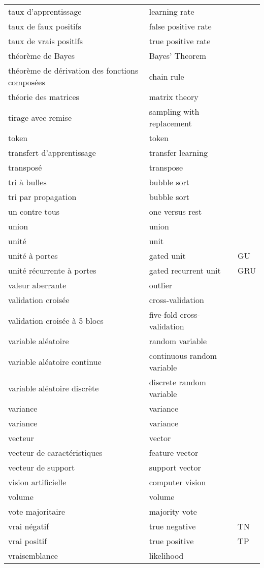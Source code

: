 \begin{longtable}{p{} p{} p{}}
taux d’apprentissage & learning rate &  \\ 
taux de faux positifs & false positive rate &  \\ 
taux de vrais positifs & true positive rate &  \\ 
théorème de Bayes & Bayes’ Theorem &  \\ 
théorème de dérivation des fonctions composées & chain rule &  \\ 
théorie des matrices & matrix theory &  \\ 
tirage avec remise & sampling with replacement &  \\ 
token & token &  \\ 
transfert d’apprentissage & transfer learning &  \\ 
transposé & transpose &  \\ 
tri à bulles & bubble sort &  \\ 
tri par propagation & bubble sort &  \\ 
un contre tous & one versus rest &  \\ 
union & union &  \\ 
unité & unit &  \\ 
unité à portes & gated unit & GU \\ 
unité récurrente à portes & gated recurrent unit & GRU \\ 
valeur aberrante & outlier &  \\ 
validation croisée & cross-validation &  \\ 
validation croisée à 5 blocs & five-fold cross-validation &  \\ 
variable aléatoire & random variable &  \\ 
variable aléatoire continue & continuous random variable &  \\ 
variable aléatoire discrète & discrete random variable &  \\ 
variance & variance &  \\ 
variance & variance &  \\ 
vecteur & vector &  \\ 
vecteur de caractéristiques & feature vector &  \\ 
vecteur de support & support vector &  \\ 
vision artificielle & computer vision &  \\ 
volume & volume &  \\ 
vote majoritaire & majority vote &  \\ 
vrai négatif & true negative & TN \\ 
vrai positif & true positive & TP \\ 
vraisemblance & likelihood &  \\
\end{longtable}